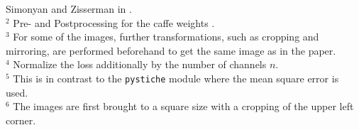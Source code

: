 \begin{landscape}
\begin{table*}[!t]
{			Simonyan and Zisserman in \cite{SZ2015}.
			\\$^2$ Pre- and Postprocessing for the caffe weights \cite{SZ2015}.
			\\$^3$ For some of the images, further transformations, such as cropping and mirroring, are performed beforehand to get the same image as in the paper.
			\\$^4$ Normalize the loss additionally by the number of channels $n$.
			\\$^5$ This is in contrast to the \texttt{pystiche} module where the mean square error is used.
			\\$^6$ The images are first brought to a square size with a cropping of the  upper left corner.
		}
	\end{table*}
\end{landscape}

